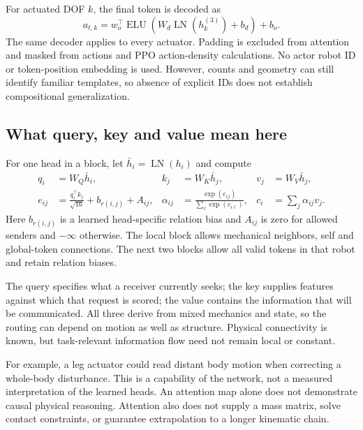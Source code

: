 \documentclass[11pt,letterpaper]{article}
\begin{document}
For actuated DOF $k$, the final token is decoded as
\begin{equation}
 a_{t,k}=w_o^\top\operatorname{ELU}
 \left(W_d\operatorname{LN}(h_k^{(3)})+b_d\right)+b_o.
\end{equation}
The same decoder applies to every actuator. Padding is excluded from attention
and masked from actions and PPO action-density calculations. No actor robot ID
or token-position embedding is used. However, counts and geometry can still
identify familiar templates, so absence of explicit IDs does not establish
compositional generalization.

\subsection{What query, key and value mean here}
For one head in a block, let $\bar h_i=\operatorname{LN}(h_i)$ and compute
\begin{align}
 q_i&=W_Q\bar h_i,& k_j&=W_K\bar h_j,& v_j&=W_V\bar h_j,\\
 e_{ij}&=\frac{q_i^\top k_j}{\sqrt{16}}+b_{r(i,j)}+A_{ij},&
 \alpha_{ij}&=\frac{\exp(e_{ij})}{\sum_{\ell}\exp(e_{i\ell})},&
 c_i&=\sum_j\alpha_{ij}v_j.
 \label{eq:attention}
\end{align}
Here $b_{r(i,j)}$ is a learned head-specific relation bias and $A_{ij}$ is zero for
allowed senders and $-\infty$ otherwise. The local block allows mechanical
neighbors, self and global-token connections. The next two blocks allow all valid
tokens in that robot and retain relation biases.

The query specifies what a receiver currently seeks; the key supplies features
against which that request is scored; the value contains the information that
will be communicated. All three derive from mixed mechanics and state, so the
routing can depend on motion as well as structure. Physical connectivity is
known, but task-relevant information flow need not remain local or constant.

For example, a leg actuator could read distant body motion when correcting a
whole-body disturbance. This is a capability of the network, not a measured
interpretation of the learned heads. An attention map alone does not demonstrate
causal physical reasoning. Attention also does not supply a mass matrix, solve
contact constraints, or guarantee extrapolation to a longer kinematic chain.
\end{document}
